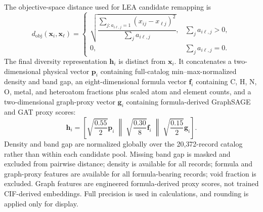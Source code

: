 \documentclass[12pt,a4paper]{article}
\begin{document}
The objective-space distance used for LEA candidate remapping is
\begin{equation}
  d_{\mathrm{obj}}(\mathbf{x}_i,\mathbf{x}_\ell)=
  \begin{cases}
  \sqrt{\dfrac{\sum_{j:a_{i\ell,j}=1}(x_{ij}-x_{\ell j})^2}{\sum_j a_{i\ell,j}}}, & \sum_j a_{i\ell,j}>0,\\[8pt]
  0, & \sum_j a_{i\ell,j}=0.
  \end{cases}
\end{equation}
The final diversity representation $\mathbf{h}_i$ is distinct from $\mathbf{x}_i$. It concatenates a two-dimensional physical vector $\mathbf{p}_i$ containing full-catalog min--max-normalized density and band gap, an eight-dimensional formula vector $\mathbf{f}_i$ containing C, H, N, O, metal, and heteroatom fractions plus scaled atom and element counts, and a two-dimensional graph-proxy vector $\mathbf{g}_i$ containing formula-derived GraphSAGE and GAT proxy scores:
\begin{equation}
  \mathbf{h}_i =
  \left[
  \sqrt{\frac{0.55}{2}}\mathbf{p}_i\;\middle\|\;
  \sqrt{\frac{0.30}{8}}\mathbf{f}_i\;\middle\|\;
  \sqrt{\frac{0.15}{2}}\mathbf{g}_i
  \right].
\end{equation}
Density and band gap are normalized globally over the 20{,}372-record catalog rather than within each candidate pool. Missing band gap is masked and excluded from pairwise distance; density is available for all records; formula and graph-proxy features are available for all formula-bearing records; void fraction is excluded. Graph features are engineered formula-derived proxy scores, not trained CIF-derived embeddings. Full precision is used in calculations, and rounding is applied only for display.
\end{document}
